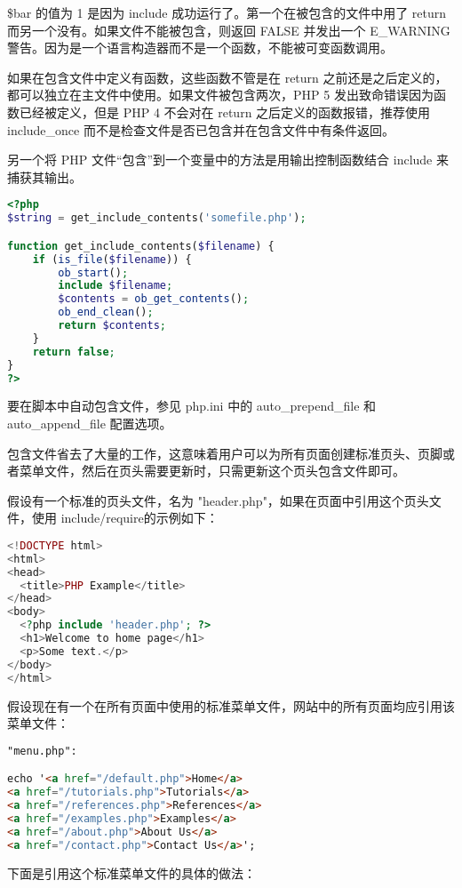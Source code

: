 \$bar 的值为 1 是因为 include 成功运行了。第一个在被包含的文件中用了 return 而另一个没有。如果文件不能被包含，则返回 FALSE 并发出一个 E\_WARNING 警告。因为是一个语言构造器而不是一个函数，不能被可变函数调用。

如果在包含文件中定义有函数，这些函数不管是在 return 之前还是之后定义的，都可以独立在主文件中使用。如果文件被包含两次，PHP 5 发出致命错误因为函数已经被定义，但是 PHP 4 不会对在 return 之后定义的函数报错，推荐使用 include\_once 而不是检查文件是否已包含并在包含文件中有条件返回。

另一个将 PHP 文件“包含”到一个变量中的方法是用输出控制函数结合 include 来捕获其输出。


\begin{lstlisting}[language=PHP]
<?php
$string = get_include_contents('somefile.php');

function get_include_contents($filename) {
    if (is_file($filename)) {
        ob_start();
        include $filename;
        $contents = ob_get_contents();
        ob_end_clean();
        return $contents;
    }
    return false;
}
?>
\end{lstlisting}

要在脚本中自动包含文件，参见 php.ini 中的 auto\_prepend\_file 和 auto\_append\_file 配置选项。

包含文件省去了大量的工作，这意味着用户可以为所有页面创建标准页头、页脚或者菜单文件，然后在页头需要更新时，只需更新这个页头包含文件即可。

假设有一个标准的页头文件，名为 "header.php"，如果在页面中引用这个页头文件，使用 include/require的示例如下：


\begin{lstlisting}[language=PHP]
<!DOCTYPE html>
<html>
<head>
  <title>PHP Example</title>
</head>
<body>
  <?php include 'header.php'; ?>
  <h1>Welcome to home page</h1>
  <p>Some text.</p>
</body>
</html>
\end{lstlisting}

假设现在有一个在所有页面中使用的标准菜单文件，网站中的所有页面均应引用该菜单文件：

\begin{lstlisting}[language=HTML]
"menu.php":

echo '<a href="/default.php">Home</a>
<a href="/tutorials.php">Tutorials</a>
<a href="/references.php">References</a>
<a href="/examples.php">Examples</a>
<a href="/about.php">About Us</a>
<a href="/contact.php">Contact Us</a>';
\end{lstlisting}

下面是引用这个标准菜单文件的具体的做法：

